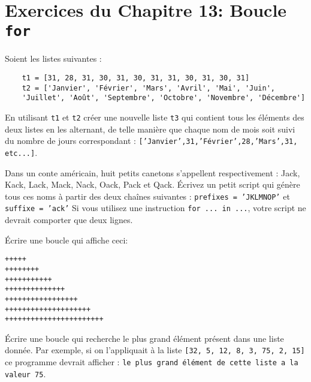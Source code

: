 
\section*{Exercices du Chapitre 13: Boucle \texttt{for}}


\begin{exercice}
Soient les listes suivantes :
\begin{verbatim}
    t1 = [31, 28, 31, 30, 31, 30, 31, 31, 30, 31, 30, 31]
    t2 = ['Janvier', 'Février', 'Mars', 'Avril', 'Mai', 'Juin',
    'Juillet', 'Août', 'Septembre', 'Octobre', 'Novembre', 'Décembre']
\end{verbatim}
En utilisant \texttt{t1} et \texttt{t2}
créer une nouvelle liste \texttt{t3} qui contient
tous les éléments des deux listes en les alternant, de telle manière
que chaque nom de mois soit suivi du nombre de jours correspondant :
\texttt{['Janvier',31,'Février',28,'Mars',31, etc...]}.
\end{exercice}

\begin{exercice}
Dans un conte américain, huit petits canetons s’appellent respectivement :
Jack, Kack, Lack, Mack, Nack, Oack, Pack et Qack. Écrivez un petit script qui
génère tous ces noms à partir des deux chaînes suivantes :
\texttt{prefixes = 'JKLMNOP'} et \texttt{suffixe = 'ack'}
Si vous utilisez une instruction \texttt{for ... in ...}, votre script ne devrait
comporter que deux lignes.
\end{exercice}

\begin{exercice}
Écrire une boucle qui affiche ceci:
\begin{verbatim}
+++++
++++++++
+++++++++++
++++++++++++++
+++++++++++++++++
++++++++++++++++++++
+++++++++++++++++++++++
\end{verbatim}
\end{exercice}

\begin{exercice}
Écrire une boucle qui recherche le plus grand élément présent dans une liste
donnée. Par exemple, si on l’appliquait à la liste \texttt{[32, 5, 12, 8, 3, 75,
2, 15]} ce programme devrait afficher : \texttt{le plus grand élément de cette liste a
la valeur 75}.
\end{exercice}

